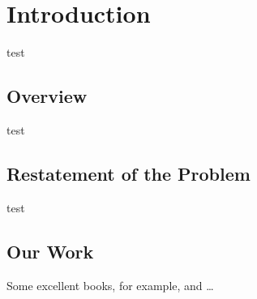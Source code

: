 \setcounter{page}{1}

\section{Introduction}

test

\subsection{Overview}

test

\subsection{Restatement of the Problem}

test

\subsection{Our Work}

Some excellent books, for example,\cite{Alice13}
and\cite{Alice14} \ldots